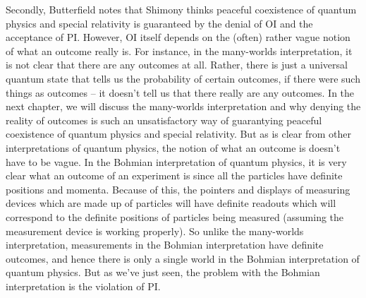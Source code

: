 \documentclass[12pt]{report}
\begin{document}
Secondly,  Butterfield notes that Shimony thinks peaceful coexistence of quantum physics and special relativity is guaranteed by the denial of OI and the acceptance of PI. However, OI itself depends on the (often) rather vague notion of what an outcome really is. For instance, in the many-worlds interpretation, it is not clear that there are any outcomes at all. Rather, there is just a universal quantum state that tells us the probability of certain outcomes, if there were such things as outcomes -- it doesn't tell us that there really are any outcomes. In the next chapter, we will discuss the many-worlds interpretation and why denying the reality of outcomes is such an unsatisfactory way of guarantying peaceful coexistence of quantum physics and special relativity. But as is clear from other interpretations of quantum physics, the notion of what an outcome is doesn't have to be vague. In the Bohmian interpretation of quantum physics, it is very clear what an outcome of an experiment is since all the particles have definite positions and momenta. Because of this, the pointers and displays of measuring devices which are made up of particles will have definite readouts which will correspond to the definite positions of particles being measured (assuming the measurement device is working properly). So unlike the many-worlds interpretation, measurements in the Bohmian interpretation have definite outcomes, and hence there is only a single world in the Bohmian interpretation of quantum physics. But as we've just seen, the problem with the Bohmian interpretation is the violation of PI.
\end{document}
